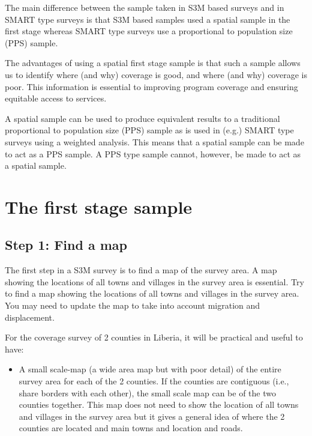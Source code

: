 \documentclass[12pt,a4paper]{book}
\providecommand{\tightlist}{%
  \setlength{\itemsep}{0pt}\setlength{\parskip}{0pt}}
\theoremstyle{definition}
\theoremstyle{definition}
\theoremstyle{definition}
\theoremstyle{remark}
\begin{document}
The main difference between the sample taken in S3M based surveys and in
SMART type surveys is that S3M based samples used a spatial sample in
the first stage whereas SMART type surveys use a proportional to
population size (PPS) sample.

The advantages of using a spatial first stage sample is that such a
sample allows us to identify where (and why) coverage is good, and where
(and why) coverage is poor. This information is essential to improving
program coverage and ensuring equitable access to services.

A spatial sample can be used to produce equivalent results to a
traditional proportional to population size (PPS) sample as is used in
(e.g.) SMART type surveys using a weighted analysis. This means that a
spatial sample can be made to act as a PPS sample. A PPS type sample
cannot, however, be made to act as a spatial sample.

\hypertarget{stage1}{%
\chapter{The first stage sample}\label{stage1}}

\hypertarget{step-1-find-a-map}{%
\section{Step 1: Find a map}\label{step-1-find-a-map}}

The first step in a S3M survey is to find a map of the survey area. A
map showing the locations of all towns and villages in the survey area
is essential. Try to find a map showing the locations of all towns and
villages in the survey area. You may need to update the map to take into
account migration and displacement.

For the coverage survey of 2 counties in Liberia, it will be practical
and useful to have:

\begin{itemize}
\tightlist
\item
  A small scale-map (a wide area map but with poor detail) of the entire
  survey area for each of the 2 counties. If the counties are contiguous
  (i.e., share borders with each other), the small scale map can be of
  the two counties together. This map does not need to show the location
  of all towns and villages in the survey area but it gives a general
  idea of where the 2 counties are located and main towns and location
  and roads.
\end{itemize}
\end{document}
